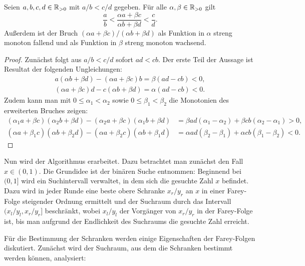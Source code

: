 \begin{lemma}\label{lemma-fraction-helpers}
	Seien $a,b,c,d\in\mathbb{R}_{>0}$ mit $a/b < c/d$ gegeben.
	Für alle $\alpha, \beta \in\mathbb{R}_{>0}$ gilt
	\[
		\frac{a}{b} < \frac{\alpha a + \beta c}{\alpha b + \beta d} < \frac{c}{d}.
	\]
	Außerdem ist der Bruch $(\alpha a + \beta c)/(\alpha b +  \beta d)$ als Funktion in $\alpha$ streng monoton fallend und als Funktion in $\beta$ streng monoton wachsend.
\end{lemma}
\begin{proof}
	Zunächst folgt aus $a/b < c/d$ sofort $ad<cb$.
	Der erste Teil der Aussage ist Resultat der folgenden Ungleichungen:
	\begin{align*}
		a(\alpha b + \beta d) - (\alpha a + \beta c)b = \beta(ad - cb) < 0,\\[1em]
		(\alpha a + \beta c)d - c(\alpha b + \beta d) = \alpha(ad - cb) < 0.
	\end{align*}
	Zudem kann man mit $0\leq\alpha_1< \alpha_2$ sowie $0\leq\beta_1< \beta_2$ die Monotonien des erweiterten Bruches zeigen:
	\begin{align*}
		(\alpha_1 a + \beta c)(\alpha_2 b + \beta d) - (\alpha_2a + \beta c)(\alpha_1 b + \beta d) &= \beta a d(\alpha_1 - \alpha_2) + \beta c b (\alpha_2 - \alpha_1) > 0, \\[1em]
		(\alpha a + \beta_1 c)(\alpha b + \beta_2 d) - (\alpha a + \beta_2c)(\alpha b + \beta_1 d) &= \alpha ad(\beta_2 - \beta_1) + \alpha cb(\beta_1 - \beta_2) < 0.
	\end{align*}
\end{proof}

Nun wird der Algorithmus erarbeitet.
Dazu betrachtet man zunächst den Fall $x\in(0,1)$.
Die Grundidee ist der binären Suche entnommen:
Beginnend bei $(0,1]$ wird ein Suchintervall verwaltet, in dem sich die gesuchte Zahl $x$ befindet.
Dazu wird in jeder Runde eine beste obere Schranke $x_r/y_r$ an $x$ in einer Farey-Folge steigender Ordnung ermittelt und der Suchraum durch das Intervall $(x_l/y_l, x_r/y_r]$ beschränkt, wobei $x_l/y_l$ der Vorgänger von $x_r/y_r$ in der Farey-Folge ist, bis man aufgrund der Endlichkeit des Suchraums die gesuchte Zahl erreicht.

Für die Bestimmung der Schranken werden einige Eigenschaften der Farey-Folgen diskutiert.
Zunächst wird der Suchraum, aus dem die Schranken bestimmt werden können, analysiert:

